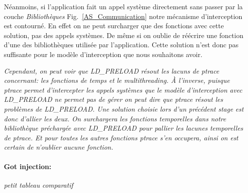 Néanmoins, si l'application fait un appel système directement sans passer par la
couche \textit{Bibliothèques} Fig.~\ref{AS_Communication} notre mécanisme
d'interception est contourné. En effet on ne peut surcharger que des fonctions
avec cette solution, pas des appels systèmes. De même si on oublie de réécrire
une fonction d'une des bibliothèques utilisée par l'application. Cette solution
n'est donc pas suffisante pour le modèle d'interception que nous souhaitons
avoir.

\textit{Cependant, on peut voir que LD\_PRELOAD résout les lacuns de ptrace
  concernant: les fonctions de temps et le multithreading. À l'inverse, puisque
  ptrace permet d'intercepter les appels systèmes que le modèle d'interception
  avec LD\_PRELOAD ne permet pas de gérer on peut dire que ptrace résout les
  problèmes de LD\_PRELOAD. Une solution choisie lors d'un précédent stage est
  donc d'allier les deux. On surchargera les fonctions temporelles dans notre
  bibliothèque préchargée avec LD\_PRELOAD pour pallier les lacunes temporelles
  de ptrace. Et pour toutes les autres fonctions ptrace s'en occupera, ainsi on
  est certain de n'oublier aucune fonction.}

\paragraph{Got injection:}

{\color{red} \textit{petit tableau comparatif}}
